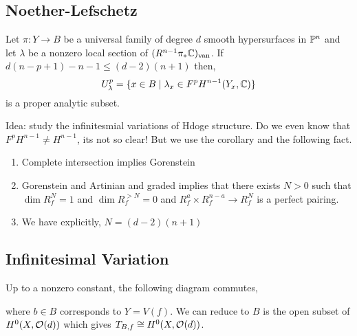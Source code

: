 \documentclass[12pt]{article}
\begin{document}
\subsection{Noether-Lefschetz}

\begin{theorem}[Carlson et al., 1983]
Let $\pi : Y \to B$ be a universal family of degree $d$ smooth hypersurfaces in $\P^n$ and let $\lambda$ be a nonzero local section of $(R^{n-1} \pi_* \CC)_{\van}$. If $d (n-p+1) - n - 1 \le (d-2)(n+1)$ then,
\[ U^p_\lambda = \{ x \in B \mid \lambda_x \in F^{p} H^{n-1}(Y_x, \CC) \} \]
is a proper analytic subset. 
\end{theorem}

\begin{theorem}
Idea: study the infinitesmial variations of Hdoge structure. Do we even know that $F^p H^{n-1} \neq H^{n-1}$, its not so clear! But we use the corollary and the following fact.
\end{theorem}

\begin{theorem}
\begin{enumerate}
\item Complete intersection implies Gorenstein
\item Gorenstein and Artinian and graded implies that there exists $N > 0$ such that $\dim{R_f^N} = 1$ and $\dim{R_f^{> N}} = 0$ and $R^a_f \times R^{n-a}_f \to R^N_f$ is a perfect pairing.
\item We have explicitly, $N = (d-2)(n+1)$
\end{enumerate}
\end{theorem}

\subsection{Infinitesimal Variation}

\begin{theorem}
Up to a nonzero constant, the following diagram commutes,
\begin{center}
\end{center}
where $b \in B$ corresponds to $Y = V(f)$. We can reduce to $B$ is the open subset of $H^0(X, \struct{}(d))$ which gives $T_{B,f} \cong H^0(X, \struct{}(d))$. 
\end{theorem}
\end{document}

